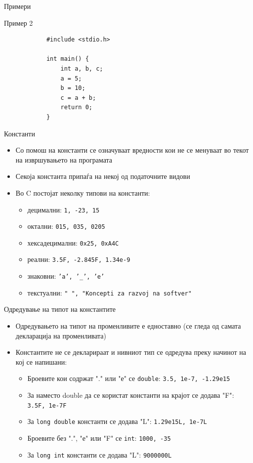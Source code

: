\begin{frame}[fragile]{Примери}
	\begin{exampleblock}{Пример 2}
		\begin{lstlisting}
			#include <stdio.h>

			int main() {
			    int a, b, c;
			    a = 5;
			    b = 10;
			    c = a + b;
			    return 0;
			}
		\end{lstlisting}
	\end{exampleblock}
\end{frame}

\begin{frame}{Константи}
\begin{itemize}
\item Со помош на константи се означуваат вредности кои не се менуваат во текот на извршувањето на програмата
\item Секоја константа припаѓа на некој од податочните видови
\item Во C постојат неколку типови на константи:
\begin{itemize}
\item децимални: \texttt{1, -23, 15}
\item октални: \texttt{015, 035, 0205}
\item хексадецимални: \texttt{0x25, 0xA4C}
\item реални: \texttt{3.5F, -2.845F, 1.34e-9}
\item знаковни: \texttt{'a', '\_', 'e'}
\item текстуални: \texttt{" ", "Koncepti za razvoj na softver"}
\end{itemize}
\end{itemize}
\end{frame}

\begin{frame}{Одредување на типот на константите}
\begin{itemize}
\item Одредувањето на типот на променливите е едноставно (се гледа од самата декларација на променливата)
\item Константите не се декларираат и нивниот тип се одредува преку начинот на кој се напишани:
\begin{itemize}
\item Броевите кои содржат "." или "е" се {\color{blue}\texttt{double}}: \texttt{3.5, 1е-7, -1.29е15}
\item За наместо double да се користат {} константи на крајот се додава "F": \texttt{3.5F, 1e-7F}
\item За {\color{blue}\texttt{long double}} константи се додава "L": \texttt{1.29е15L, 1e-7L}
\item Броевите без ".", "е" или "F" се {\color{blue}\texttt{int}}: \texttt{1000, -35}
\item За {\color{blue}\texttt{long int}} константи се додава "L": \texttt{9000000L}
\end{itemize}
\end{itemize}
\end{frame}

